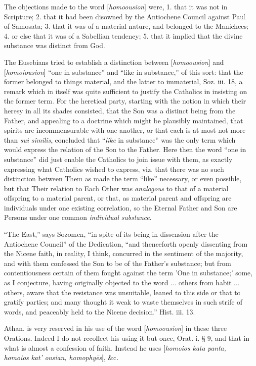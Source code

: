 The objections made to the word [\emph{homoousion}]
were, 1. that it was not in Scripture; 2. that it had been disowned by
the Antiochene Council against Paul of Samosata; 3. that it was of a
material nature, and belonged to the Manichees; 4. or else that it was
of a Sabellian tendency; 5. that it implied that the divine substance
was distinct from God.

The Eusebians tried to establish a distinction
between [\emph{homoousion}] and [\emph{homoiousion}] ``one in substance''
and ``like in substance,'' of this sort: that the former belonged to
things material, and the latter to immaterial, Soz. iii. 18, a remark
which in itself was quite sufficient to justify the Catholics in
insisting on the former term. For the heretical party, starting with
the notion in which their heresy in all its shades consisted, that the
Son was a distinct being from the Father, and appealing to a
doctrine which might be plausibly maintained, that spirits are
incommensurable with one another, or that each is at most not more
than \emph{sui similis}, concluded that ``\emph{like} in substance'' was
the only term which would express the relation of the Son to the
Father. Here then the word ``one in substance'' did just enable the
Catholics to join issue with them, as exactly expressing what
Catholics wished to express, viz. that there was no such distinction
between Them as made the term ``like'' necessary, or even possible, but
that Their relation to Each Other was \emph{analogous} to that of a
material offspring to a material parent, or that, as material parent
and offspring are individuals under one existing correlation, so the
Eternal Father and Son are Persons under one common \emph{individual
substance}.

``The East,'' says Sozomen, ``in spite of its being
in dissension after the Antiochene Council'' of the Dedication, ``and
thenceforth openly dissenting from the Nicene faith, in reality, I
think, concurred in the sentiment of the majority, and with them
confessed the Son to be of the Father's substance; but from
contentiousness certain of them fought against the term 'One in
substance;' some, as I conjecture, having originally objected to the
word ... others from habit ... others, aware that the resistance was
unsuitable, leaned to this side or that to gratify parties; and many
thought it weak to waste themselves in such strife of words, and
peaceably held to the Nicene decision.'' Hist. iii. 13.

Athan. is very reserved in his use of the word [\emph{homoousion}]
in these three Orations. Indeed I do not recollect his using it but
once, Orat. i. § 9, and that in what is almost a confession of faith.
Instead he uses [\emph{homoios kata panta, homoios kat'
ousian, homophy\={e}s}], \&c.

